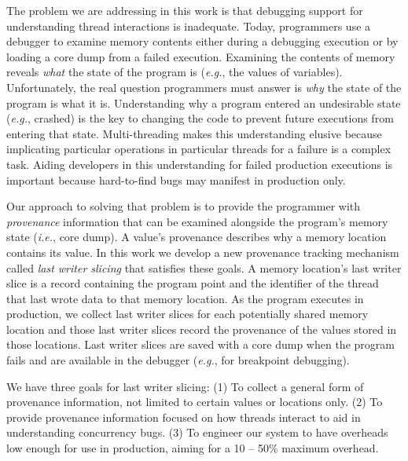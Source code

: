 \documentclass[preprint,10pt]{sigplanconf}
\begin{document}
The problem we are addressing in this work is that debugging support for
understanding thread interactions is inadequate.  Today, programmers use a
debugger to examine memory contents either during a debugging execution or by
loading a core dump from a failed execution.  Examining the contents of memory
reveals {\em what} the state of the program is ({\em e.g.}, the values of
variables).  Unfortunately, the real question programmers must answer is {\em
why} the state of the program is what it is.  Understanding why a program
entered an undesirable state ({\em e.g.}, crashed) is the key to changing the
code to prevent future executions from entering that state.  Multi-threading
makes this understanding elusive because implicating particular operations in
particular threads for a failure is a complex task.  Aiding developers in this
understanding for failed production executions is important because
hard-to-find bugs may manifest in production only.



Our approach to solving that problem is to provide the programmer with {\em
provenance} information that can be examined alongside the program's memory
state ({\em i.e.}, core dump).  A value's provenance describes why a memory
location contains its value.  In this work we develop a new provenance tracking
mechanism called {\em last writer slicing} that satisfies these goals.  A
memory location's last writer slice is a record containing the program point
and the identifier of the thread that last wrote data to that memory location.
As the program executes in production, we collect last writer slices for each
potentially shared memory location and those last writer slices record the
provenance of the values stored in those locations.  Last writer slices are
saved with a core dump when the program fails and are available in the debugger
({\em e.g.}, for breakpoint debugging).

We have three goals for last writer slicing:  (1) To collect a general form of
provenance information, not limited to certain values or locations only. (2) To
provide provenance information focused on how threads interact to aid in
understanding concurrency bugs. (3) To engineer our system to have overheads
low enough for use in production, aiming for a 10 -- 50\% maximum overhead. 
\end{document}
